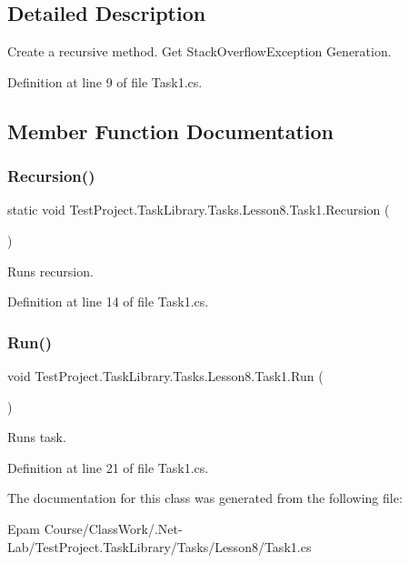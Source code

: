 \subsection{Detailed Description}
Create a recursive method. Get Stack\+Overflow\+Exception Generation. 



Definition at line 9 of file Task1.\+cs.



\subsection{Member Function Documentation}
\mbox{\label{class_test_project_1_1_task_library_1_1_tasks_1_1_lesson8_1_1_task1_a6adf7388679d5f260865e5bdb48b8770}} 
\subsubsection{\texorpdfstring{Recursion()}{Recursion()}}
{\footnotesize\ttfamily static void Test\+Project.\+Task\+Library.\+Tasks.\+Lesson8.\+Task1.\+Recursion (\begin{DoxyParamCaption}{ }\end{DoxyParamCaption})\hspace{0.3cm}{\ttfamily [static]}}



Runs recursion. 



Definition at line 14 of file Task1.\+cs.

\mbox{\label{class_test_project_1_1_task_library_1_1_tasks_1_1_lesson8_1_1_task1_a4ade97f465d174e9d0d47892f5e79d5f}} 
\subsubsection{\texorpdfstring{Run()}{Run()}}
{\footnotesize\ttfamily void Test\+Project.\+Task\+Library.\+Tasks.\+Lesson8.\+Task1.\+Run (\begin{DoxyParamCaption}{ }\end{DoxyParamCaption})}



Runs task. 



Definition at line 21 of file Task1.\+cs.



The documentation for this class was generated from the following file\+:\begin{DoxyCompactItemize}
\item 
Epam Course/\+Class\+Work/.\+Net-\/\+Lab/\+Test\+Project.\+Task\+Library/\+Tasks/\+Lesson8/Task1.\+cs\end{DoxyCompactItemize}
